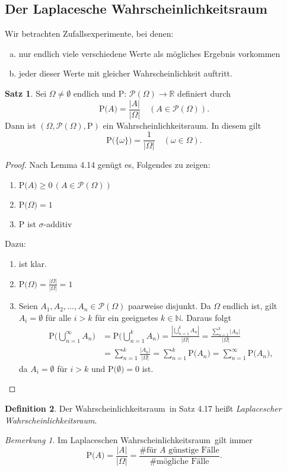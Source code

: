\documentclass[a4paper,12pt,fleqn]{scrartcl}
\newcommand{\N}{\mathbb{N}}
\newcommand{\R}{\mathbb{R}}
\newcommand{\m}[1]{\mathcal{ #1 }}
\newcommand{\p}[1]{\text{P(} #1 \text{)}}
\newcommand{\ZE}{Zufallsexperiment}
\newcommand{\WR}{Wahrscheinlichkeitsraum}
\theoremstyle{definition}
\newtheorem{definition}{Definition}[section]
\newtheorem{satz}[definition]{Satz}
\theoremstyle{plain}
\theoremstyle{remark}
\newtheorem*{bemerkung}{Bemerkung}
\begin{document}
\subsection{Der Laplacesche \WR}
Wir betrachten \ZE e, bei denen:
\begin{enumerate}[a)]
\item nur endlich viele verschiedene Werte als mögliches Ergebnis vorkommen
\item jeder dieser Werte mit gleicher Wahrscheinlichkeit auftritt.
\end{enumerate}
\begin{satz}
Sei $\Omega \neq \emptyset$ endlich und P: $\m{P}(\Omega) \rightarrow \R$ definiert durch
\[\p{A} = \frac{| A |}{| \Omega |} \quad (A \in \m{P}(\Omega)).\]
Dann ist $(\Omega, \m{P}(\Omega), \text{P})$ ein \WR. In diesem gilt
\[\p{\{\omega\}} = \frac{1}{| \Omega |} \quad (\omega \in \Omega).\]
\end{satz}
\begin{proof}
Nach Lemma 4.14 genügt es, Folgendes zu zeigen:
\begin{enumerate}[(1)]
\item $\p{A} \geq 0 \, (A \in \m{P}(\Omega))$
\item $\p{\Omega} = 1$
\item P ist $\sigma$-additiv
\end{enumerate}
Dazu:
\begin{enumerate}[(1)]
\item ist klar.
\item $\p{\Omega} = \frac{| \Omega |}{| \Omega |} = 1$
\item Seien $A_1, A_2, \ldots, A_n \in \m{P}(\Omega)$ paarweise disjunkt. Da $\Omega$ endlich ist, gilt $A_i = \emptyset$ für alle $i > k$ für ein geeignetes $k \in \N$. Daraus folgt
\begin{align*}
\p{\bigcup_{n=1}^\infty A_n} &= \p{\bigcup_{n=1}^k A_n} = \frac{| \bigcup_{n=1}^k A_n |}{| \Omega |} = \frac{\sum_{n=1}^k | A_n |}{| \Omega |} \\
&= \sum_{n=1}^k \frac{| A_n |}{| \Omega |} = \sum_{n=1}^k \p{A_n} = \sum_{n=1}^\infty \p{A_n},
\end{align*}
da $A_i = \emptyset$ für $i > k$ und $\p{\emptyset} = 0$ ist.
\end{enumerate}
\end{proof}
\begin{definition}
Der \WR \, in Satz 4.17 heißt \emph{Laplacescher \WR}.
\end{definition}
\begin{bemerkung}
Im Laplaceschen \WR \, gilt immer
\[\p{A} = \frac{| A |}{| \Omega |} = \frac{\text{\# für } A \text{ günstige Fälle}}{\text{\# mögliche Fälle}}.\]
\end{bemerkung}
\end{document}
